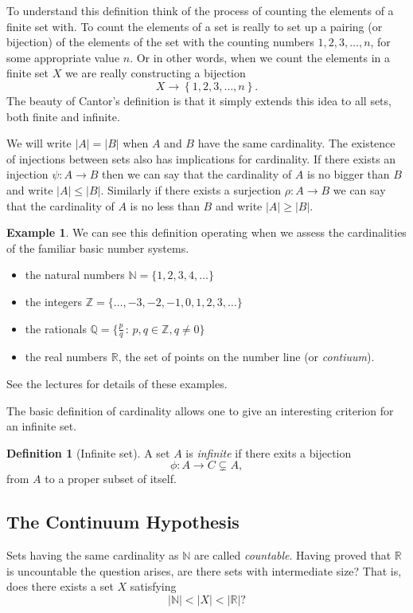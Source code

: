 \documentclass[extrafontsizes, twoside, a4paper]{memoir}
\theoremstyle{plain}%
\theoremstyle{definition}
\newtheorem{defn}{Definition}[chapter]
\newtheorem{exmp}{Example}[chapter]
\theoremstyle{remark}
\begin{document}
To understand this definition think of the process of counting the elements of a finite set with. To count the elements of a set is really to set up a pairing (or bijection) of the elements of the set with the counting numbers $1, 2, 3, \dots , n$, for some appropriate value $n$. Or in other words, when we count the elements in a finite set $X$ we are really constructing a bijection
$$ X \to \left \{ 1, 2, 3, \dots , n \right \}.$$
The beauty of Cantor's definition is that it simply extends this idea to all sets, both finite and infinite.

We will write $|A|=|B|$ when $A$ and $B$ have the same cardinality. The existence of injections between sets also has implications for cardinality. If there exists an injection $\psi: A \to B$ then we can say that the cardinality of $A$ is no bigger than $B$ and write $|A|\leq |B|$. Similarly if there exists a surjection $\rho : A \to B$ we can say that the cardinality of $A$ is no less than $B$ and write $|A| \geq |B|$.

\begin{exmp}
We can see this definition operating when we assess the cardinalities of the familiar basic number systems.
\begin{itemize}
\item
the natural numbers $\mathbb{N} = \{ 1, 2, 3, 4, \dots \}$
\item
the integers $\mathbb{Z} = \{ \dots, -3, -2, -1, 0, 1, 2, 3, \dots \}$
\item
the rationals $\mathbb{Q} = \{ \frac{p}{q} \, : \, p,q \in \mathbb{Z}, q \neq 0 \}$
\item
the real numbers $\mathbb{R}$, the set of points on the number line (or \emph{contiuum}).
\end{itemize}
See the lectures for details of these examples.
\end{exmp}

The basic definition of cardinality allows one to give an interesting criterion for an infinite set.
\begin{defn}[Infinite set]
A set $A$ is \emph{infinite} if there exits a bijection
    $$\phi : A \to C \subsetneq A,$$
from $A$ to a proper subset of itself.
\end{defn}

\subsection{The Continuum Hypothesis}
Sets having the same cardinality as $\mathbb{N}$ are called \emph{countable}. Having proved that $\mathbb{R}$ is uncountable the question arises, are there sets with intermediate size? That is, does there exists a set $X$ satisfying
$$ |\mathbb{N}| < |X| < |\mathbb{R}| ?$$
\end{document}
